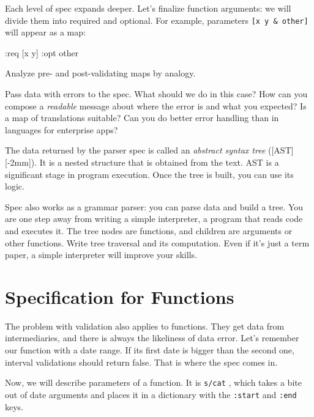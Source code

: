 Each level of spec expands deeper. Let's finalize function arguments: we will divide them into required and optional. For example, parameters \verb|[x y & other]| will appear as a map:

\begin{english}
  \begin{clojure}
{:req [x y] :opt other}
  \end{clojure}
\end{english}

\noindent
Analyze pre- and post-validating maps by analogy.

Pass data with errors to the spec. What should we do in this case? How can you compose a \emph{readable} message about where the error is and what you expected? Is a map of translations suitable? Can you do better error handling than in languages for enterprise apps?

The data returned by the parser spec is called an \emph{abstract syntax tree} ([AST][-2mm]). It is a nested structure that is obtained from the text. AST is a significant stage in program execution. Once the tree is built, you can use its logic.


Spec also works as a grammar parser: you can parse data and build a tree. You are one step away from writing a simple interpreter, a program that reads code and executes it. The tree nodes are functions, and children are arguments or other functions. Write tree traversal and its computation. Even if it's just a term paper, a simple interpreter will improve your skills.

\section{Specification for Functions}


The problem with validation also applies to functions. They get data from intermediaries, and there is always the likeliness of data error. Let's remember our function with a date range. If its first date is bigger than the second one, interval validations should return false. That is where the spec comes in.

Now, we will describe parameters of a function. It is \verb|s/cat| , which takes a bite out of date arguments and places it in a dictionary with the \verb|:start| and \verb|:end| keys.

